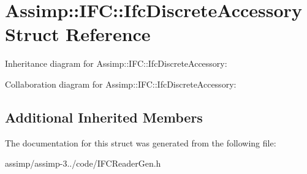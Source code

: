 \hypertarget{struct_assimp_1_1_i_f_c_1_1_ifc_discrete_accessory}{\section{Assimp\+:\+:I\+F\+C\+:\+:Ifc\+Discrete\+Accessory Struct Reference}
\label{struct_assimp_1_1_i_f_c_1_1_ifc_discrete_accessory}
}


Inheritance diagram for Assimp\+:\+:I\+F\+C\+:\+:Ifc\+Discrete\+Accessory\+:


Collaboration diagram for Assimp\+:\+:I\+F\+C\+:\+:Ifc\+Discrete\+Accessory\+:
\subsection*{Additional Inherited Members}


The documentation for this struct was generated from the following file\+:\begin{DoxyCompactItemize}
\item 
assimp/assimp-\/3../code/I\+F\+C\+Reader\+Gen.\+h\end{DoxyCompactItemize}
